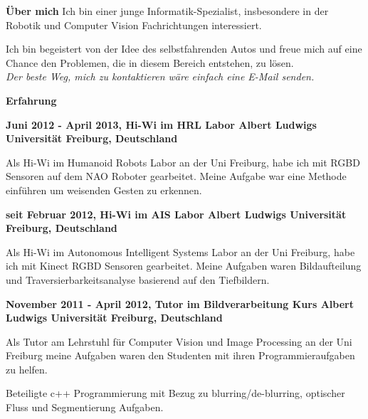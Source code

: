 \documentclass[a4paper,12pt,final]{memoir}
\newcommand{\Sep}{\vspace{1.5em}}
\newcommand{\SmallSep}{\vspace{0.5em}}
\newenvironment{AboutMe}
	{\ignorespaces\textbf{\color{Black} \"{U}ber mich}}
	{\Sep\ignorespacesafterend}
\newcommand{\CVSection}[1]
	{\Large\textbf{#1}\par
	\SmallSep\normalsize\normalfont}
\newcommand{\CVItem}[1]
	{\textbf{\color{MidnightBlue} #1}}
\begin{document}
\normalsize\normalfont

\begin{AboutMe}
\newline 
Ich bin einer junge Informatik-Spezialist, insbesondere in der Robotik und Computer Vision Fachrichtungen interessiert.

Ich bin begeistert von der Idee des selbstfahrenden Autos und freue mich auf eine Chance den Problemen, die in diesem Bereich entstehen, zu l\"{o}sen. \\
\emph {Der beste Weg, mich zu kontaktieren w\"{a}re einfach eine E-Mail senden.}
\end{AboutMe}

\CVSection{Erfahrung}
\CVItem{Juni 2012 - April 2013, Hi-Wi im HRL Labor
\newline Albert Ludwigs Universit\"{a}t Freiburg, Deutschland}
\begin{compactitem}[\color{RoyalBlue}$\circ$]
	\item Als Hi-Wi im Humanoid Robots Labor an der Uni Freiburg, habe ich mit RGBD Sensoren auf dem NAO Roboter gearbeitet. Meine Aufgabe war eine Methode einf\"{u}hren um weisenden Gesten zu erkennen. 
\end{compactitem}
\SmallSep

\CVItem{seit Februar 2012, Hi-Wi im AIS Labor
\newline Albert Ludwigs Universit\"{a}t Freiburg, Deutschland}
\begin{compactitem}[\color{RoyalBlue}$\circ$]
\item Als Hi-Wi im Autonomous Intelligent Systems Labor an der Uni Freiburg, habe ich mit Kinect RGBD Sensoren gearbeitet. Meine Aufgaben waren Bildaufteilung und Traversierbarkeitsanalyse basierend auf den Tiefbildern. 
\end{compactitem}
\SmallSep

\CVItem{November 2011 - April 2012, Tutor im Bildverarbeitung Kurs
\newline Albert Ludwigs Universit\"{a}t Freiburg, Deutschland}
\begin{compactitem}[\color{RoyalBlue}$\circ$]
\item Als Tutor am Lehrstuhl f\"{u}r Computer Vision und Image Processing an der Uni Freiburg meine Aufgaben waren den Studenten mit ihren Programmieraufgaben zu helfen. 
\item Beteiligte c++ Programmierung mit Bezug zu blurring/de-blurring, optischer Fluss und Segmentierung Aufgaben.
\end{compactitem}
\SmallSep
\end{document}
